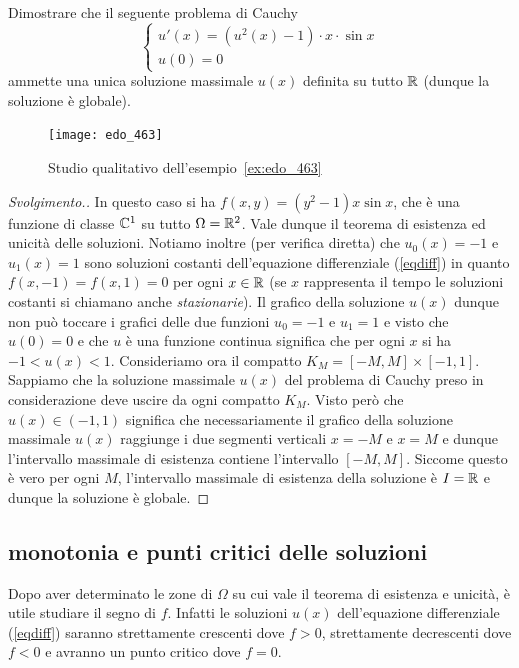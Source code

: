 \begin{example}\label{ex:edo_463}
Dimostrare che il seguente problema di Cauchy
\[
	\begin{cases}
		u'(x) = (u^2(x)-1)\cdot x\cdot \sin x \\
		u(0) = 0
	\end{cases}
\]
ammette una unica soluzione massimale $u(x)$
definita su tutto $\mathbb R$ (dunque la soluzione è globale).
\end{example}
\begin{figure}
  \centering\texttt{[image: edo\_463]}
  \label{fig:edo_463}
  \caption{Studio qualitativo dell'esempio~\ref{ex:edo_463}}
\end{figure}
%
\begin{proof}[Svolgimento.]
In questo caso si ha $f(x,y)=(y^2-1)x\sin x$, che \`e una funzione
di classe $\mathbb C^1$ su tutto $\Omega=\mathbb R^2$.
Vale dunque il teorema di esistenza ed
unicità delle soluzioni.
Notiamo inoltre (per verifica diretta)
che $u_0(x)=-1$ e $u_1(x)=1$ sono
soluzioni costanti dell'equazione differenziale (\ref{eqdiff})
in quanto $f(x,-1)=f(x,1)=0$ per ogni $x\in \mathbb R$
(se $x$ rappresenta il tempo le soluzioni costanti si chiamano
anche \emph{stazionarie}).
Il grafico della soluzione $u(x)$ dunque
non può toccare i grafici delle due funzioni $u_0=-1$ e $u_1=1$ e visto
che $u(0)=0$ e che $u$ è una funzione continua significa
che per ogni $x$ si ha $-1 < u(x) < 1$.
Consideriamo ora il compatto
$K_M=[-M,M] \times [-1,1]$.
Sappiamo che la soluzione
massimale $u(x)$ del problema di Cauchy preso in considerazione deve
uscire da ogni compatto $K_M$.
Visto però che $u(x)\in (-1,1)$ significa che necessariamente
il grafico della soluzione massimale $u(x)$
raggiunge i due segmenti verticali
$x=-M$ e $x=M$ e dunque l'intervallo massimale di esistenza
contiene l'intervallo $[-M,M]$.
Siccome questo è vero per ogni $M$, l'intervallo massimale
di esistenza della soluzione è $I=\mathbb R$ e dunque la soluzione
è globale.
\end{proof}

\subsection{monotonia e punti critici delle soluzioni}

Dopo aver determinato le zone di $\Omega$ su cui vale il teorema di
esistenza e unicit\`a, \`e utile studiare il segno di $f$. Infatti
le soluzioni $u(x)$ dell'equazione differenziale (\ref{eqdiff})
saranno strettamente crescenti dove $f>0$, strettamente decrescenti
dove $f<0$ e avranno un punto critico dove $f=0$.

